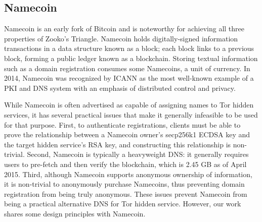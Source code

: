 \subsection{Namecoin}
\label{sec:Namecoin}

Namecoin is an early fork of Bitcoin\cite{nakamoto2008bitcoin} and is noteworthy for achieving all three properties of Zooko's Triangle. Namecoin holds digitally-signed information transactions in a data structure known as a block; each block links to a previous block, forming a public ledger known as a blockchain. Storing textual information such as a domain registration consumes some Namecoins, a unit of currency. In 2014, Namecoin was recognized by ICANN as the most well-known example of a PKI and DNS system with an emphasis of distributed control and privacy\cite{NamecoinReportICANN}.

While Namecoin is often advertised as capable of assigning names to Tor hidden services, it has several practical issues that make it generally infeasible to be used for that purpose. First, to authenticate registrations, clients must be able to prove the relationship between a Namecoin owner's secp256k1 ECDSA key and the target hidden service's RSA key, and constructing this relationship is non-trivial. Second, Namecoin is typically a heavyweight DNS: it generally requires users to pre-fetch and then verify the blockchain, which is 2.45 GB as of April 2015\cite{BitInfoCharts}. Third, although Namecoin supports anonymous ownership of information, it is non-trivial to anonymously purchase Namecoins, thus preventing domain registration from being truly anonymous. These issues prevent Namecoin from being a practical alternative DNS for Tor hidden service. However, our work shares some design principles with Namecoin.
